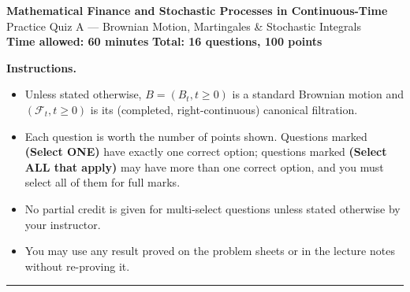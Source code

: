\documentclass[11pt]{article}
\begin{document}
\begin{center}
{\LARGE\bfseries Mathematical Finance and Stochastic Processes in Continuous-Time}\\[4pt]
{\Large Practice Quiz A --- Brownian Motion, Martingales \& Stochastic Integrals}\\[8pt]
\textbf{Time allowed: 60 minutes} \qquad \textbf{Total: 16 questions, 100 points}
\end{center}

\vspace{4pt}
\noindent\textbf{Instructions.}
\begin{itemize}[nosep,leftmargin=*]
  \item Unless stated otherwise, $B=(B_t,t\ge0)$ is a standard Brownian motion and $(\mathcal F_t,t\ge0)$ is its (completed, right-continuous) canonical filtration.
  \item Each question is worth the number of points shown. Questions marked \textbf{(Select ONE)} have exactly one correct option; questions marked \textbf{(Select ALL that apply)} may have more than one correct option, and you must select all of them for full marks.
  \item No partial credit is given for multi-select questions unless stated otherwise by your instructor.
  \item You may use any result proved on the problem sheets or in the lecture notes without re-proving it.
\end{itemize}

\vspace{10pt}
\hrule
\vspace{10pt}
\end{document}

